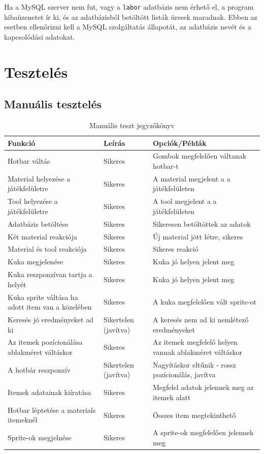 \documentclass[]{thesis-ekf}
\begin{document}
	Ha a MySQL szerver nem fut, vagy a \texttt{labor} adatbázis nem érhető el, a program hibaüzenetet ír ki, és az adatbázisból betöltött listák üresek maradnak. Ebben az esetben ellenőrizni kell a MySQL szolgáltatás állapotát, az adatbázis nevét és a kapcsolódási adatokat.
	
	\chapter{Tesztelés}
	
	\section{Manuális tesztelés}
	\begin{table}[ht!]
		\centering
		\footnotesize
		\begin{tabular}{|>{\centering}m{4.5cm}|>{\centering}m{3cm}|>{\centering\arraybackslash}m{7cm}|}
			\hline
			\textbf{Funkció} & \textbf{Leírás} & \textbf{Opciók/Példák} \\
			\hline
			Hotbar váltás & Sikeres & Gombok megfelelően váltanak hotbar-t \\
			\hline
			Material helyezése a játékfelületre & Sikeres & A material megjelent a a játékfelületen \\
			\hline
			Tool helyezése a játékfelületre & Sikeres & A tool megjelent a a játékfelületen \\
			\hline
			Adatbázis betöltése & Sikeres & Sikeresen betöltöttek az adatok \\
			\hline
			Két material reakciója & Sikeres & Új material jött létre, sikeres \\
			\hline
			Material és tool reakciója & Sikeres & Sikeres reakció \\
			\hline
			Kuka megjelenése & Sikeres & Kuka jó helyen jelent meg \\
			\hline
			Kuka reszponzívan tartja a helyét & Sikeres & Kuka jó helyen jelent meg \\
			\hline
			Kuka sprite váltása ha adott item van a közelében & Sikeres & A kuka megfelelően vált sprite-ot \\
			\hline
			Keresés jó eredményeket ad ki & Sikertelen (javítva) & A keresés nem ad ki nemlétező eredményeket \\
			\hline
			Az itemek pozícionálása ablakméret váltáskor & Sikeres & Az itemek megfelelő helyen vannak ablakméret váltáskor \\
			\hline
			A hotbár reszponzív & Sikertelen (javítva) & Nagyításkor eltűnik - rossz pozícionálás, javítva\\
			\hline
			Itemek adatainak kiíratása & Sikeres & Megfelel adatok jelennek meg az itemek alatt \\
			\hline
			Hotbar léptetése a materials itemeknél & Sikeres & Összes item megtekinthető \\
			\hline
			Sprite-ok megjelnése & Sikeres & A sprite-ok megfelelően jelennek meg \\
			\hline
		\end{tabular}
		\caption{Manuális teszt jegyzőkönyv}
		\label{MTeszt-jegyzokonyv}
	\end{table}
	
\end{document}
